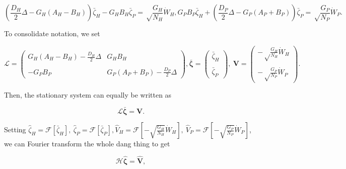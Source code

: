 \documentclass{article}
\begin{document}
\begin{subequations}
  \begin{equation}
    \left(\frac{D_H}{2}\Delta-G_H(A_H-B_H)\right)\bar\zeta_H-G_HB_H\bar\zeta_P=\sqrt\frac{G_H}{N_H}\dot W_H,
  \end{equation}
  \begin{equation}
    G_PB_P\bar \zeta_H+\left(\frac{D_P}{2}\Delta-G_P(A_P+B_P)\right)\bar\zeta_P=\sqrt\frac{G_P}{N_P}\dot W_P.
  \end{equation}
\end{subequations}

To consolidate notation, we set

\begin{subequations}
  \begin{equation}
    \pmb{\mathscr{L}} = \left(\begin{matrix}
      G_H(A_H-B_H)-\frac{D_H}{2}\Delta & G_HB_H \\ & \\
      -G_PB_P & G_P(A_P+B_P)-\frac{D_P}{2}\Delta
    \end{matrix}\right),
  \end{equation}
  \begin{equation}
    \bar{\pmb{\zeta}} = \left(\begin{matrix}
      \bar\zeta_H \\ \\ \bar\zeta_P
    \end{matrix}\right), \ 
    \pmb{V} = \left(\begin{matrix}
      -\sqrt\frac{G_H}{N_H}\dot W_H \\ \\ 
      -\sqrt\frac{G_P}{N_P}\dot W_P
    \end{matrix}\right).
  \end{equation}
\end{subequations}

Then, the stationary system can equally be written as

\begin{equation}
  \pmb{\mathscr{L}}\bar{\pmb\zeta}=\pmb V.
\end{equation}

Setting
\(\hat\zeta_H=\mathcal{F}[\bar\zeta_H], \ \hat\zeta_P=\mathcal{F}[\bar\zeta_P], \hat V_H=\mathcal{F}[-\sqrt{\frac{G_H}{N_H}}\dot W_H], \ \hat V_P=\mathcal{F}[-\sqrt{\frac{G_P}{N_P}}\dot W_P]\),
we can Fourier transform the whole dang thing to get

\begin{equation}
  \pmb{\mathcal{H}}\hat{\pmb\zeta}=\hat{\pmb V},
\end{equation}
\end{document}
